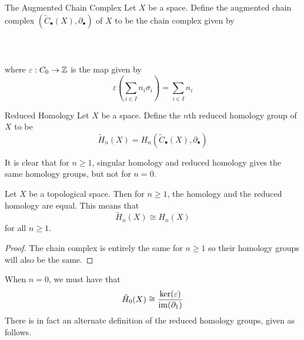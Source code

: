 \documentclass[a4paper]{article}
\begin{document}
\begin{defn}{The Augmented Chain Complex}{} Let $X$ be a space. Define the augmented chain complex $(\widetilde{C}_\bullet(X),\partial_\bullet)$ of $X$ to be the chain complex given by \\~\\
\\~\\
where $\varepsilon:C_0\to\mathbb{Z}$ is the map given by $$\varepsilon\left(\sum_{i\in I}n_i\sigma_i\right)=\sum_{i\in I}n_i$$
\end{defn}

\begin{defn}{Reduced Homology}{} Let $X$ be a space. Define the $n$th reduced homology group of $X$ to be $$\widetilde{H}_n(X)=H_n(\widetilde{C}_\bullet(X),\partial_\bullet)$$
\end{defn}

It is clear that for $n\geq 1$, singular homology and reduced homology gives the same homology groups, but not for $n=0$. 

\begin{lmm}{}{} Let $X$ be a topological space. Then for $n\geq 1$, the homology and the reduced homology are equal. This means that $$\widetilde{H}_n(X)\cong H_n(X)$$ for all $n\geq 1$. \tcbline
\begin{proof}
The chain complex is entirely the same for $n\geq 1$ so their homology groups will also be the same. 
\end{proof}
\end{lmm}

When $n=0$, we must have that $$\tilde{H}_0(X)\cong\frac{\ker(\varepsilon)}{\operatorname{im}(\partial_1)}$$ There is in fact an alternate definition of the reduced homology groups, given as follows. 
\end{document}
